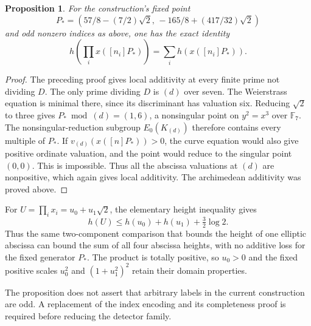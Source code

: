 \documentclass[11pt]{article}
\newtheorem{proposition}{Proposition}
\begin{document}
\begin{proposition}
For the construction's fixed point
\[
 P_*=(57/8-(7/2)\sqrt2,\,-165/8+(417/32)\sqrt2)
\]
and odd nonzero indices as above, one has the exact identity
\[
 h\left(\prod_i x([n_i]P_*)\right)=\sum_i h(x([n_i]P_*)).
\]
\end{proposition}
\begin{proof}
The preceding proof gives local additivity at every finite prime not
dividing $D$. The only prime dividing $D$ is $(d)$ over seven. The
Weierstrass equation is minimal there, since its discriminant has
valuation six. Reducing $\sqrt2$ to three gives
$P_*\bmod(d)=(1,6)$, a nonsingular point on $y^2=x^3$ over
$\mathbb F_7$. The nonsingular-reduction subgroup $E_0(K_{(d)})$ therefore
contains every multiple of $P_*$. If $v_{(d)}(x([n]P_*))>0$, the curve
equation would also give positive ordinate valuation, and the point
would reduce to the singular point $(0,0)$. This is impossible. Thus
all the abscissa valuations at $(d)$ are nonpositive, which again gives
local additivity. The archimedean additivity was proved above.
\end{proof}

For $U=\prod_i x_i=u_0+u_1\sqrt2$, the elementary height inequality gives
\[
 h(U)\leq h(u_0)+h(u_1)+\tfrac32\log2.
\]
Thus the same two-component comparison that bounds the height of one
elliptic abscissa can bound the sum of all four abscissa heights, with no additive loss for the fixed generator $P_*$. The product is totally positive, so
$u_0>0$ and the fixed positive scales $u_0^2$ and $(1+u_1^2)^2$ retain
their domain properties.

The proposition does not assert that arbitrary labels in the current
construction are odd. A replacement of the index encoding and its
completeness proof is required before reducing the detector family.
\end{document}
